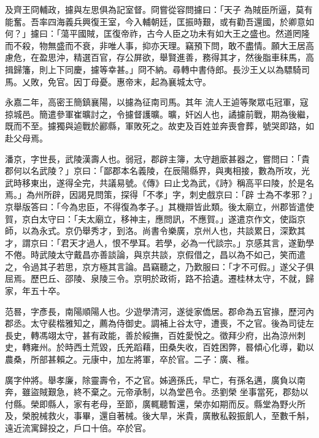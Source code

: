 \begin{pinyinscope}
 及齊王冏輔政，攄與左思俱為記室督。冏嘗從容問攄曰：「天子
 為賊臣所逼，莫有能奮。吾率四海義兵興復王室，今入輔朝廷，匡振時艱，或有勸吾還國，於卿意如何？」攄曰：「蕩平國賊，匡復帝祚，古今人臣之功未有如大王之盛也。然道罔隆而不殺，物無盛而不衰，非唯人事，抑亦天理。竊預下問，敢不盡情。願大王居高慮危，在盈思沖，精選百官，存公屏欲，舉賢進善，務得其才，然後脂車秣馬，高揖歸籓，則上下同慶，攄等幸甚。」冏不納。尋轉中書侍郎。長沙王乂以為驃騎司馬。乂敗，免官。因丁母憂。惠帝末，起為襄城太守。



 永嘉二年，高密王簡鎮襄陽，以攄為征南司馬。其年
 流人王逌等聚眾屯冠軍，寇掠城邑。簡遣參軍崔曠討之，令攄督護曠。曠，奸凶人也，譎攄前戰，期為後繼，既而不至。攄獨與逌戰於酈縣，軍敗死之。故吏及百姓並奔喪會葬，號哭即路，如赴父母焉。



 潘京，字世長，武陵漢壽人也。弱冠，郡辟主簿，太守趙廞甚器之，嘗問曰：「貴郡何以名武陵？」京曰：「鄙郡本名義陵，在辰陽縣界，與夷相接，數為所攻，光武時移東出，遂得全完，共議易號。《傳》曰止戈為武，《詩》稱高平曰陵，於是名焉。」為州所辟，因謁見問策，探得「不孝」字，刺史戲京曰：「辟
 士為不孝邪？」京舉版答曰：「今為忠臣，不得復為孝子。」其機辯皆此類。後太廟立，州郡皆遣使賀，京白太守曰：「夫太廟立，移神主，應問訊，不應賀。」遂遣京作文，使詣京師，以為永式。京仍舉秀才，到洛。尚書令樂廣，京州人也，共談累日，深歎其才，謂京曰：「君天才過人，恨不學耳。若學，必為一代談宗。」京感其言，遂勤學不倦。時武陵太守戴昌亦善談論，與京共談，京假借之，昌以為不如己，笑而遣之，令過其子若思，京方極其言論。昌竊聽之，乃歎服曰：「才不可假。」遂父子俱屈焉。歷巴丘、邵陵、泉陵三令。京明於政術，路不拾遺。遷桂林太守，不就，歸家，年五十卒。



 范晷，字彥長，南陽順陽人也。少遊學清河，遂徙家僑居。郡命為五官掾，歷河內郡丞。太守裴楷雅知之，薦為侍御史。調補上谷太守，遭喪，不之官。後為司徒左長史，轉馮翊太守，甚有政能，善於綏撫，百姓愛悅之。徵拜少府，出為涼州刺史，轉雍州。於時西土荒毀，氏羌蹈藉，田桑失收，百姓困弊，晷傾心化導，勸以農桑，所部甚賴之。元康中，加左將軍，卒於官。二子：廣、稚。



 廣字仲將。舉孝廉，除靈壽令，不之官。姊適孫氏，早亡，有孫名邁，廣負以南奔，雖盜賊艱急，終不棄之。元帝承制，以為堂邑令。丞劉榮
 坐事當死，郡劾以付縣。榮即縣人，家有老母，至節，廣輒聽暫還，榮亦如期而反。縣堂為野火所及，榮脫械救火，事畢，還自著械。後大旱，米貴，廣散私穀振飢人，至數千斛，遠近流寓歸投之，戶口十倍。卒於官。




\end{pinyinscope}
